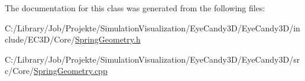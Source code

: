 The documentation for this class was generated from the following files\+:\begin{DoxyCompactItemize}
\item 
C\+:/\+Library/\+Job/\+Projekte/\+Simulation\+Visualization/\+Eye\+Candy3\+D/\+Eye\+Candy3\+D/include/\+E\+C3\+D/\+Core/\mbox{\hyperlink{_spring_geometry_8h}{Spring\+Geometry.\+h}}\item 
C\+:/\+Library/\+Job/\+Projekte/\+Simulation\+Visualization/\+Eye\+Candy3\+D/\+Eye\+Candy3\+D/src/\+Core/\mbox{\hyperlink{_spring_geometry_8cpp}{Spring\+Geometry.\+cpp}}\end{DoxyCompactItemize}
